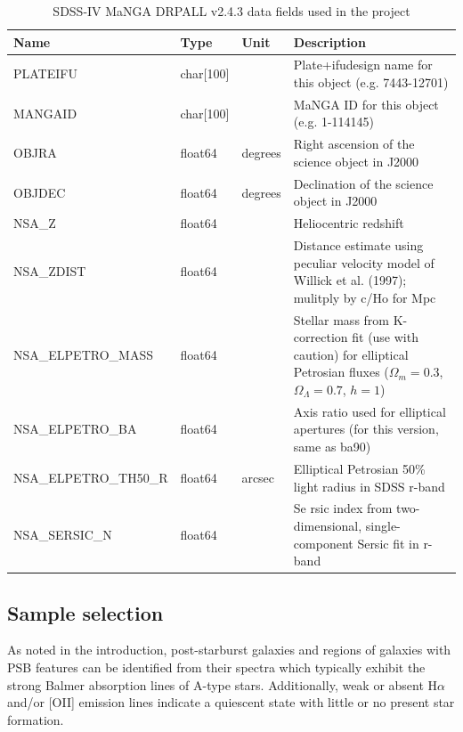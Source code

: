 \begin{table}
\caption[MaNGA DRPALL fields used in the project]{SDSS-IV MaNGA DRPALL v2.4.3 data fields used in the project}
\label{tab:DRPall-table}
\begin{tabular}{|p{3.2cm}|p{1.2cm}||p{1cm}|p{10cm}|}
\hline
Name & Type & Unit & Description \\
\hline
PLATEIFU & char{[}100{]} &  & Plate+ifudesign name for this object (e.g. 7443-12701)\\
MANGAID & char{[}100{]} & & MaNGA ID for this object (e.g. 1-114145)\\
OBJRA & float64 & degrees & Right ascension of the science object in J2000\\
OBJDEC & float64 & degrees & Declination of the science object in J2000\\
NSA\_Z & float64 &  & Heliocentric redshift\\
NSA\_ZDIST & float64 &  & Distance estimate using peculiar velocity model of Willick et al. (1997); mulitply by c/Ho for Mpc\\
NSA\_ELPETRO\_MASS & float64 &  & Stellar mass from K-correction fit (use with caution) for elliptical Petrosian fluxes ($\Omega_m=0.3$, $\Omega_\Lambda=0.7$, $h=1$)\\
NSA\_ELPETRO\_BA & float64 &  & Axis ratio used for elliptical apertures (for this version, same as ba90)\\
NSA\_ELPETRO\_TH50\_R & float64 & arcsec & Elliptical Petrosian 50\% light radius in SDSS r-band\\
NSA\_SERSIC\_N & float64 &  & Se
rsic index from two-dimensional, single-component Sersic fit in r-band\\
\hline
\end{tabular}
\end{table}

\subsection{Sample selection}
As noted in the introduction, post-starburst galaxies and regions of galaxies with PSB features can be identified from their spectra which typically exhibit the strong Balmer absorption lines of A-type stars. Additionally, weak or absent H$\alpha$ and/or [OII] emission lines indicate a quiescent state with little or no present star formation. 


